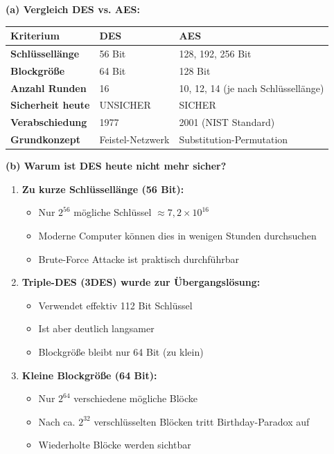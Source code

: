 \documentclass[12pt,a4paper]{article}
\begin{document}
\begin{tcolorbox}[colback=solutionbg, colframe=black!30]

\textbf{(a) Vergleich DES vs. AES:} \checkmark

\centering
\begin{tabular}{|l|l|l|}
    \hline
    \textbf{Kriterium} & \textbf{DES} & \textbf{AES} \\
    \hline
    \textbf{Schlüssellänge} & 56 Bit & 128, 192, 256 Bit \\
    \hline
    \textbf{Blockgröße} & 64 Bit & 128 Bit \\
    \hline
    \textbf{Anzahl Runden} & 16 & 10, 12, 14 (je nach Schlüssellänge) \\
    \hline
    \textbf{Sicherheit heute} & UNSICHER & SICHER \\
    \hline
    \textbf{Verabschiedung} & 1977 & 2001 (NIST Standard) \\
    \hline
    \textbf{Grundkonzept} & Feistel-Netzwerk & Substitution-Permutation \\
    \hline
\end{tabular}

\textbf{(b) Warum ist DES heute nicht mehr sicher?} \checkmark

\begin{enumerate}[1.]
    \item \textbf{Zu kurze Schlüssellänge (56 Bit):}
    \begin{itemize}
        \item Nur $2^{56}$ mögliche Schlüssel $\approx 7,2 \times 10^{16}$
        \item Moderne Computer können dies in wenigen Stunden durchsuchen
        \item Brute-Force Attacke ist praktisch durchführbar
    \end{itemize}
    
    \item \textbf{Triple-DES (3DES) wurde zur Übergangslösung:}
    \begin{itemize}
        \item Verwendet effektiv 112 Bit Schlüssel
        \item Ist aber deutlich langsamer
        \item Blockgröße bleibt nur 64 Bit (zu klein)
    \end{itemize}
    
    \item \textbf{Kleine Blockgröße (64 Bit):}
    \begin{itemize}
        \item Nur $2^{64}$ verschiedene mögliche Blöcke
        \item Nach ca. $2^{32}$ verschlüsselten Blöcken tritt Birthday-Paradox auf
        \item Wiederholte Blöcke werden sichtbar
    \end{itemize}
    

\end{enumerate}
\end{tcolorbox}
\end{document}
